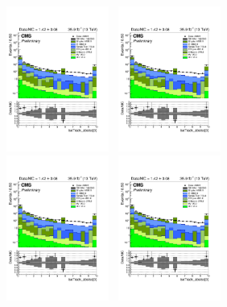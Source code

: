\begin{figure}[h!]
\begin{center}
    \includegraphics[width=0.3\textwidth,page=4,trim=0 100 50 100,clip]{figures/SITV/SIT/SIT.pdf}~
    \includegraphics[width=0.3\textwidth,page=7,trim=0 100 50 100,clip]{figures/SITV/SIT/SIT.pdf}\\
    \includegraphics[width=0.3\textwidth,page=2,trim=0 100 50 100,clip]{figures/SITV/SIT/SIT.pdf}~
    \includegraphics[width=0.3\textwidth,page=1,trim=0 100 50 100,clip]{figures/SITV/SIT/SIT.pdf}~

\end{center}
\end{figure}
